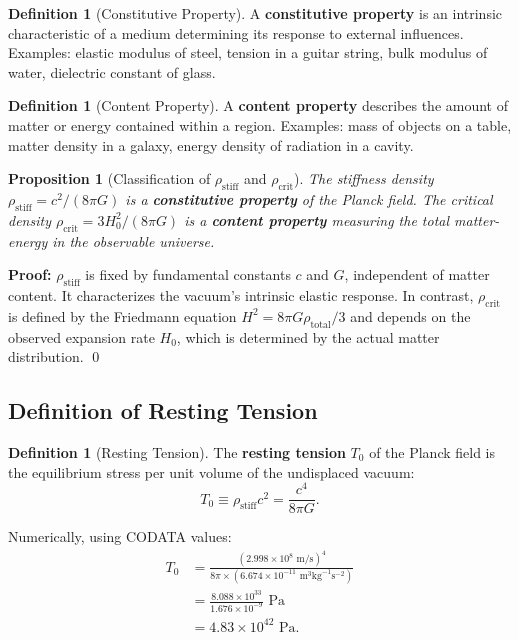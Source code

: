 \documentclass[11pt,a4paper]{article}
\newcommand{\rhocrit}{\ensuremath{\rho_{\mathrm{crit}}}}
\newcommand{\rhostiff}{\ensuremath{\rho_{\mathrm{stiff}}}}
\newcommand{\Tzero}{\ensuremath{T_0}}
\newtheorem{proposition}[theorem]{Proposition}
\theoremstyle{definition}
\newtheorem{definition}[theorem]{Definition}
\theoremstyle{remark}
\begin{document}
\begin{definition}[Constitutive Property]
A \textbf{constitutive property} is an intrinsic characteristic of a medium determining its response to external influences. Examples: elastic modulus of steel, tension in a guitar string, bulk modulus of water, dielectric constant of glass.
\end{definition}

\begin{definition}[Content Property]
A \textbf{content property} describes the amount of matter or energy contained within a region. Examples: mass of objects on a table, matter density in a galaxy, energy density of radiation in a cavity.
\end{definition}

\begin{proposition}[Classification of $\rhostiff$ and $\rhocrit$]
\label{prop:classification}
The stiffness density $\rhostiff = c^2/(8\pi G)$ is a \textbf{constitutive property} of the Planck field. The critical density $\rhocrit = 3H_0^2/(8\pi G)$ is a \textbf{content property} measuring the total matter-energy in the observable universe.
\end{proposition}

\textbf{Proof:} $\rhostiff$ is fixed by fundamental constants $c$ and $G$, independent of matter content. It characterizes the vacuum's intrinsic elastic response. In contrast, $\rhocrit$ is defined by the Friedmann equation $H^2 = 8\pi G\rho_{\mathrm{total}}/3$ and depends on the observed expansion rate $H_0$, which is determined by the actual matter distribution. \qed

\subsection{Definition of Resting Tension}
\label{sec:resting_tension_def}

\begin{definition}[Resting Tension]
The \textbf{resting tension} $\Tzero$ of the Planck field is the equilibrium stress per unit volume of the undisplaced vacuum:
\begin{equation}
\label{eq:resting_tension}
\boxed{\Tzero \equiv \rhostiff c^2 = \frac{c^4}{8\pi G}.}
\end{equation}
\end{definition}

Numerically, using CODATA values:
\begin{align}
\Tzero &= \frac{(2.998 \times 10^8 \text{ m/s})^4}{8\pi \times (6.674 \times 10^{-11} \text{ m}^3\text{kg}^{-1}\text{s}^{-2})} \nonumber \\
&= \frac{8.088 \times 10^{33}}{1.676 \times 10^{-9}} \text{ Pa} \nonumber \\
&= 4.83 \times 10^{42} \text{ Pa}.
\end{align}
\end{document}
